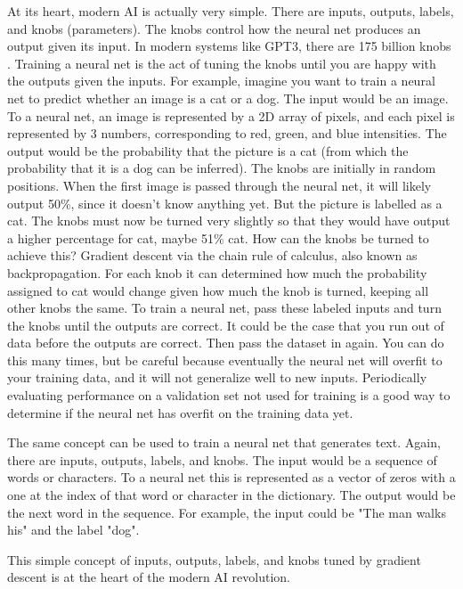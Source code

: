 At its heart, modern AI is actually very simple.  There are inputs, outputs, labels, and knobs (parameters).  The knobs control how the neural net produces an output given its input.  In modern systems like GPT3, there are 175 billion knobs \cite{brown2020language}.  Training a neural net is the act of tuning the knobs until you are happy with the outputs given the inputs.  For example, imagine you want to train a neural net to predict whether an image is a cat or a dog.  The input would be an image.  To a neural net, an image is represented by a 2D array of pixels, and each pixel is represented by 3 numbers, corresponding to red, green, and blue intensities.  The output would be the probability that the picture is a cat (from which the probability that it is a dog can be inferred).  The knobs are initially in random positions.  When the first image is passed through the neural net, it will likely output 50\%, since it doesn't know anything yet.  But the picture is labelled as a cat.  The knobs must now be turned very slightly so that they would have output a higher percentage for cat, maybe 51\% cat.  How can the knobs be turned to achieve this?  Gradient descent via the chain rule of calculus, also known as backpropagation.  For each knob it can determined how much the probability assigned to cat would change given how much the knob is turned, keeping all other knobs the same. To train a neural net, pass these labeled inputs and turn the knobs until the outputs are correct.  It could be the case that you run out of data before the outputs are correct.  Then pass the dataset in again.  You can do this many times, but be careful because eventually the neural net will overfit to your training data, and it will not generalize well to new inputs.  Periodically evaluating performance on a validation set not used for training is a good way to determine if the neural net has overfit on the training data yet.

The same concept can be used to train a neural net that generates text.  Again, there are inputs, outputs, labels, and knobs.  The input would be a sequence of words or characters.  To a neural net this is represented as a vector of zeros with a one at the index of that word or character in the dictionary.  The output would be the next word in the sequence.  For example, the input could be "The man walks his" and the label "dog".

This simple concept of inputs, outputs, labels, and knobs tuned by gradient descent is at the heart of the modern AI revolution.

